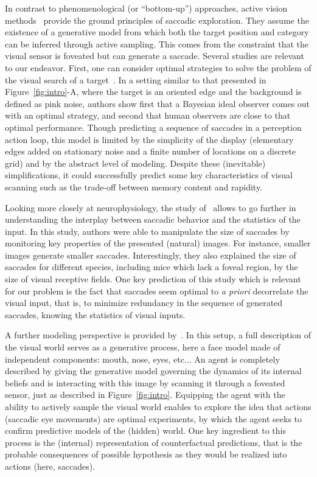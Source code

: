 In contrast to phenomenological (or ``bottom-up'') approaches, active vision methods~\citep{Najemnik05,Butko2010infomax,Friston12} provide the ground principles of saccadic exploration. They assume the existence of a generative model from which both the target position and category can be inferred through active sampling. This comes from the constraint that the visual sensor is foveated but can generate a saccade. 
Several studies are relevant to our endeavor. First, one can consider optimal strategies to solve the problem of the visual search of a target~\citep{Najemnik05}. In a setting similar to that presented in Figure~\ref{fig:intro}-A, where the target is an oriented edge and the background is defined as pink noise, authors show first that a Bayesian ideal observer comes out with an optimal strategy, and second that human observers are close to that optimal performance. Though predicting a sequence of saccades in a perception action loop, this model is limited by the simplicity of the display (elementary edges added on stationary noise and a finite number of locations on a discrete grid) and by the abstract level of modeling. Despite these (inevitable) simplifications, it could successfully predict some key characteristics of visual scanning such as the trade-off between memory content and rapidity.

Looking more closely at neurophysiology, the study of~\citep{Samonds18} allows to go further in understanding the interplay between saccadic behavior and the statistics of the input. In this study, authors were able to manipulate the size of saccades by monitoring key properties of the presented (natural) images. For instance, smaller images generate smaller saccades. Interestingly, they also explained the size of saccades for different species, including mice which lack a foveal region, by the size of visual receptive fields. One key prediction of this study which is relevant for our problem is the fact that saccades seem optimal to \emph{a priori} decorrelate the visual input, that is, to minimize redundancy in the sequence of generated saccades, knowing the statistics of visual inputs.

A further modeling perspective is provided by~\citep{Friston12}. In this setup, a full description of the visual world serves as a generative process, here a face model made of independent components: mouth, nose, eyes, etc... An agent is completely described by giving the generative model governing the dynamics of its internal beliefs and is interacting with this image by scanning it through a foveated sensor, just as described in Figure~\ref{fig:intro}. Equipping the agent with the ability to actively sample the visual world enables to explore the idea that actions (saccadic eye movements) are optimal experiments, by which the agent seeks to confirm predictive models of the (hidden) world. One key ingredient to this process is the (internal) representation of counterfactual predictions, that is the probable consequences of possible hypothesis as they would be realized into actions (here, saccades).

